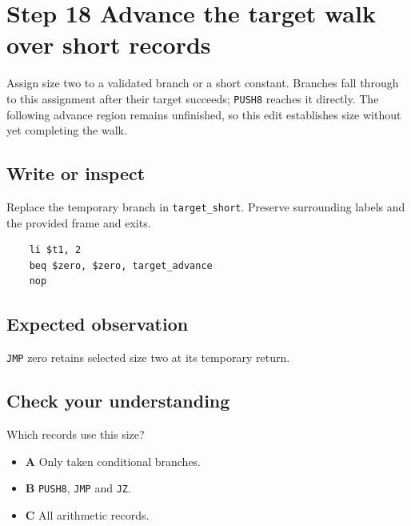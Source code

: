 \section{Step 18 Advance the target walk over short records}\label{vm-s18}

Assign size two to a validated branch or a short constant. Branches fall through to this assignment after their target succeeds; \texttt{PUSH8} reaches it directly. The following advance region remains unfinished, so this edit establishes size without yet completing the walk.

\subsection{Write or inspect}
Replace the temporary branch in \texttt{target\_short}. Preserve surrounding labels and the provided frame and exits.

\begin{verbatim}
    li $t1, 2
    beq $zero, $zero, target_advance
    nop
\end{verbatim}
\subsection{Expected observation}
\texttt{JMP} zero retains selected size two at its temporary return.

\subsection{Check your understanding}
Which records use this size?

\begin{itemize}
  \item \textbf{A} Only taken conditional branches.
  \item \textbf{B} \texttt{PUSH8}, \texttt{JMP} and \texttt{JZ}.
  \item \textbf{C} All arithmetic records.
\end{itemize}
